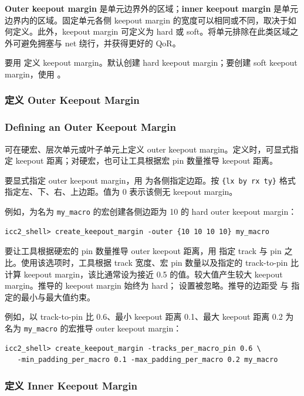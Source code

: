 \textbf{Outer keepout margin} 是单元边界外的区域；\textbf{inner keepout margin} 是单元边界内的区域。固定单元各侧 keepout margin 的宽度可以相同或不同，取决于如何定义。此外，keepout margin 可定义为 hard 或 soft。将单元排除在此类区域之外可避免拥塞与 net 绕行，并获得更好的 QoR。

要用  定义 keepout margin。默认创建 hard keepout margin；要创建 soft keepout margin，使用 。

\subsubsection{定义 Outer Keepout Margin}
\subsubsection*{Defining an Outer Keepout Margin}

可在硬宏、层次单元或叶子单元上定义 outer keepout margin。定义时，可显式指定 keepout 距离；对硬宏，也可让工具根据宏 pin 数量推导 keepout 距离。

要显式指定 outer keepout margin，用  为各侧指定边距。按 \texttt{\{lx by rx ty\}} 格式指定左、下、右、上边距。值为 0 表示该侧无 keepout margin。

例如，为名为 \texttt{my\_macro} 的宏创建各侧边距为 10 的 hard outer keepout margin：
\begin{lstlisting}
icc2_shell> create_keepout_margin -outer {10 10 10 10} my_macro
\end{lstlisting}

要让工具根据硬宏的 pin 数量推导 outer keepout 距离，用  指定 track 与 pin 之比。使用该选项时，工具根据 track 宽度、宏 pin 数量以及指定的 track-to-pin 比计算 keepout margin，该比通常设为接近 0.5 的值。较大值产生较大 keepout margin。推导的 keepout margin 始终为 hard； 设置被忽略。推导的边距受  与  指定的最小与最大值约束。

例如，以 track-to-pin 比 0.6、最小 keepout 距离 0.1、最大 keepout 距离 0.2 为名为 \texttt{my\_macro} 的宏推导 outer keepout margin：
\begin{lstlisting}
icc2_shell> create_keepout_margin -tracks_per_macro_pin 0.6 \
   -min_padding_per_macro 0.1 -max_padding_per_macro 0.2 my_macro
\end{lstlisting}

\subsubsection{定义 Inner Keepout Margin}

